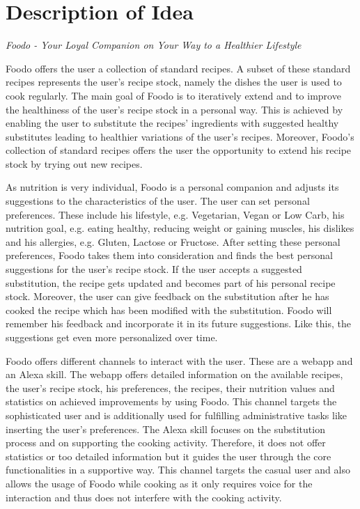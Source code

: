 \chapter{Description of Idea}
\begin{center}
\textit{Foodo - Your Loyal Companion on Your Way to a Healthier Lifestyle}
\end{center}

Foodo offers the user a collection of standard recipes. A subset of these standard recipes represents the user's recipe stock, namely the dishes the user is used to cook regularly. The main goal of Foodo is to iteratively extend and to improve the healthiness of the user's recipe stock in a personal way. This is achieved by enabling the user to substitute the recipes' ingredients with suggested healthy substitutes leading to healthier variations of the user's recipes. Moreover, Foodo's collection of standard recipes offers the user the opportunity to extend his recipe stock by trying out new recipes. 

As nutrition is very individual, Foodo is a personal companion and adjusts its suggestions to the characteristics of the user. The user can set personal preferences. These include his lifestyle, e.g. Vegetarian, Vegan or Low Carb, his nutrition goal, e.g. eating healthy, reducing weight or gaining muscles, his dislikes and his allergies, e.g. Gluten, Lactose or Fructose. After setting these personal preferences, Foodo takes them into consideration and finds the best personal suggestions for the user's recipe stock. If the user accepts a suggested substitution, the recipe gets updated and becomes part of his personal recipe stock. Moreover, the user can give feedback on the substitution after he has cooked the recipe which has been modified with the substitution. Foodo will remember his feedback and incorporate it in its future suggestions. Like this, the suggestions get even more personalized over time.

Foodo offers different channels to interact with the user. These are a webapp and an Alexa skill. The webapp offers detailed information on the available recipes, the user's recipe stock, his preferences, the recipes, their nutrition values and statistics on achieved improvements by using Foodo. This channel targets the sophisticated user and is additionally used for fulfilling administrative tasks like inserting the user's preferences. The Alexa skill focuses on the substitution process and on supporting the cooking activity. Therefore, it does not offer statistics or too detailed information but it guides the user through the core functionalities in a supportive way. This channel targets the casual user and also allows the usage of Foodo while cooking as it only requires voice for the interaction and thus does not interfere with the cooking activity.


